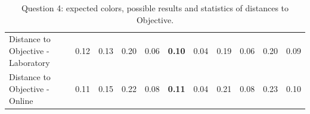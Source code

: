 \begin{table}[H]
{\begin{tabular}{lccccccccccccc}
    \multicolumn{4}{l}{Distance to Objective - Laboratory}                                                                                           & \multicolumn{1}{|c}{0.12}       & \multicolumn{1}{c|}{0.13}    & \multicolumn{1}{|c}{0.20}       & \multicolumn{1}{c|}{0.06}    & \multicolumn{1}{|c}{\textbf{0.10}}         & \multicolumn{1}{c|}{0.04}    & \multicolumn{1}{|c}{0.19}       & \multicolumn{1}{c|}{0.06}    & \multicolumn{1}{|c}{0.20}       & \multicolumn{1}{c|}{0.09}    \\
    \multicolumn{4}{l}{Distance to Objective - Online}                                                                                               & \multicolumn{1}{|c}{0.11}       & \multicolumn{1}{c|}{0.15}    & \multicolumn{1}{|c}{0.22}       & \multicolumn{1}{c|}{0.08}    & \multicolumn{1}{|c}{\textbf{0.11}}         & \multicolumn{1}{c|}{0.04}    & \multicolumn{1}{|c}{0.21}        & \multicolumn{1}{c|}{0.08}    & \multicolumn{1}{|c}{0.23}       & \multicolumn{1}{c|}{0.10}    \\ \hline
    \end{tabular}}
  \caption[Question 4, with expected Results.]{Question 4: expected colors, possible results and statistics of distances to Objective.}
  \vspace{-5pt}
  \label{table:lab_q4_expected}
\end{table}
%
